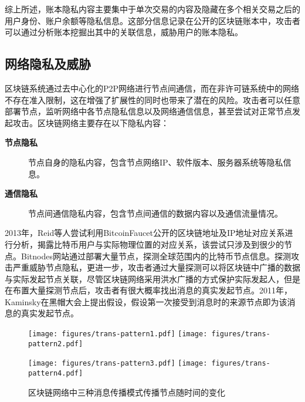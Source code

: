 综上所述，账本隐私内容主要集中于单次交易的内容及隐藏在多个相关交易之后的用户身份、账户余额等隐私信息。这部分信息记录在公开的区块链账本中，攻击者可以通过分析账本挖掘出其中的关联信息，威胁用户的账本隐私。

\subsection{网络隐私及威胁}

区块链系统通过去中心化的P2P网络进行节点间通信，而在非许可链系统中的网络不存在准入限制，这在增强了扩展性的同时也带来了潜在的风险。攻击者可以任意部署节点，监听网络中各节点隐私信息以及网络通信信息，甚至尝试对正常节点发起攻击。区块链网络主要存在以下隐私内容：

\begin{description}
  \item[\textbf{节点隐私}] 节点自身的隐私内容，包含节点网络IP、软件版本、服务器系统等隐私信息。
  \item[\textbf{通信隐私}] 节点间通信隐私内容，包含节点间通信的数据内容以及通信流量情况。
\end{description}

2013年，Reid等人尝试利用BitcoinFaucet公开的区块链地址及IP地址对应关系进行分析，揭露比特币用户与实际物理位置的对应关系，该尝试只涉及到很少的节点。Bitnodes网站通过部署大量节点，探测全球范围内的比特币节点信息。探测攻击严重威胁节点隐私，更进一步，攻击者通过大量探测可以将区块链中广播的数据与实际发起节点关联，尽管区块链网络采用洪水广播的方式保护实际发起人，但是在布置大量探测节点后，攻击者有很大概率找出消息的真实发起节点。2011年，Kaminsky在黑帽大会上提出假设，假设第一次接受到消息时的来源节点即为该消息的真实发起节点。

\begin{figure}[ht]
  \centering%
    {\texttt{[image: figures/trans-pattern1.pdf]}}%
  \hspace{2em}%
  	{\texttt{[image: figures/trans-pattern2.pdf]}}

    {\texttt{[image: figures/trans-pattern3.pdf]}}%
  \hspace{2em}%
  	{\texttt{[image: figures/trans-pattern4.pdf]}}
  \caption{区块链网络中三种消息传播模式传播节点随时间的变化}
  \label{fig:trans3}
\end{figure}

